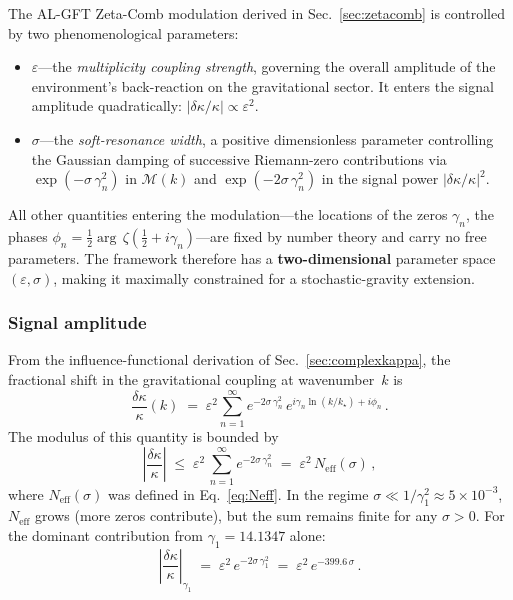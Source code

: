 \documentclass[12pt,a4paper]{article}
\begin{document}
The AL-GFT Zeta-Comb modulation derived in
Sec.~\ref{sec:zetacomb} is controlled by two
phenomenological parameters:
\begin{itemize}
\item $\varepsilon$\;---\;the \emph{multiplicity coupling
  strength}, governing the overall amplitude of the
  environment's back-reaction on the gravitational
  sector.  It enters the signal amplitude quadratically:
  $|\delta\kappa/\kappa|\propto\varepsilon^2$.

\item $\sigma$\;---\;the \emph{soft-resonance width},
  a positive dimensionless parameter controlling
  the Gaussian damping of successive Riemann-zero
  contributions via
  $\exp(-\sigma\,\gamma_n^2)$ in $\mathcal{M}(k)$
  and $\exp(-2\sigma\,\gamma_n^2)$ in the signal
  power $|\delta\kappa/\kappa|^2$.
\end{itemize}
All other quantities entering the modulation---the
locations of the zeros $\gamma_n$, the phases
$\phi_n = \tfrac{1}{2}\arg\,\zeta(\tfrac{1}{2}+i\gamma_n)$---are
fixed by number theory and carry no free parameters.
The framework therefore has a \textbf{two-dimensional}
parameter space $(\varepsilon,\sigma)$, making it
maximally constrained for a stochastic-gravity extension.


\subsubsection{Signal amplitude}

From the influence-functional derivation of
Sec.~\ref{sec:complexkappa}, the fractional shift
in the gravitational coupling at wavenumber~$k$ is
\begin{equation}\label{eq:deltakappa}
  \frac{\delta\kappa}{\kappa}(k)
  \;=\;
  \varepsilon^2
  \sum_{n=1}^{\infty}
  e^{-2\sigma\,\gamma_n^2}\,
  e^{i\gamma_n\ln(k/k_\star) + i\phi_n}\,.
\end{equation}
The modulus of this quantity is bounded by
\begin{equation}\label{eq:deltakappa-bound}
  \left|\frac{\delta\kappa}{\kappa}\right|
  \;\le\;
  \varepsilon^2\,
  \sum_{n=1}^{\infty} e^{-2\sigma\,\gamma_n^2}
  \;=\;
  \varepsilon^2\,N_{\mathrm{eff}}(\sigma)\,,
\end{equation}
where $N_{\mathrm{eff}}(\sigma)$ was defined in
Eq.~\eqref{eq:Neff}.  In the regime
$\sigma\ll 1/\gamma_1^2\approx 5\times 10^{-3}$,
$N_{\mathrm{eff}}$ grows (more zeros contribute),
but the sum remains finite for any $\sigma>0$.
For the dominant contribution from $\gamma_1=14.1347$
alone:
\begin{equation}\label{eq:signal-leading}
  \left|\frac{\delta\kappa}{\kappa}\right|_{\gamma_1}
  \;=\;
  \varepsilon^2\,
  e^{-2\sigma\,\gamma_1^2}
  \;=\;
  \varepsilon^2\,
  e^{-399.6\,\sigma}\,.
\end{equation}
\end{document}
